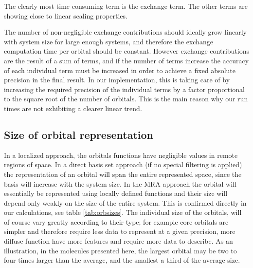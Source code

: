 \documentclass[%
 aip,
 amsmath,amssymb,
 reprint,%
]{revtex4-1}
\begin{document}


The clearly most time consuming term is the exchange term. The other terms are showing close to linear scaling properties.

The number of non-negligible exchange contributions should ideally grow linearly with system size for large enough systems, and therefore the exchange computation time per orbital should be constant. However exchange contributions are the result of a sum of terms, and if the number of terms increase the accuracy of each individual term must be increased in order to achieve a fixed absolute precision in the final result. In our implementation, this is taking care of by increasing the required precision of the individual terms by a factor proportional to the square root of the number of orbitals. This is the main reason why our run times are not exhibiting a clearer linear trend.


\subsection{Size of orbital representation}
\label{sizes}

In a localized approach, the orbitals functions have negligible values in remote regions of space. In a direct basis set approach (if no special filtering is applied) the representation of an orbital will span the entire represented space, since the basis will increase with the system size. In the MRA approach the orbital will essentially be represented using locally defined functions and their size will depend only weakly on the size of the entire system.
This is confirmed directly in our calculations, see table \ref{tab:orbsizes}.
The individual size of the orbitals, will of course vary greatly according to their type; for example core orbitals are simpler and therefore require less data to represent at a given precision, more diffuse function have more features and require more data to describe. As an illustration, in the molecules presented here, the largest orbital may be two to four times larger than the average, and the smallest a third of the average size.
\end{document}
